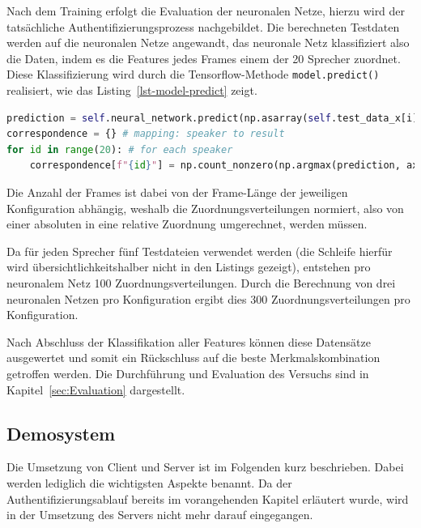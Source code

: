 Nach dem Training erfolgt die Evaluation der neuronalen Netze, hierzu wird der tatsächliche Authentifizierungsprozess nachgebildet.
Die berechneten Testdaten werden auf die neuronalen Netze angewandt, das neuronale Netz klassifiziert also die Daten, indem es die Features jedes Frames einem der 20 Sprecher zuordnet.
Diese Klassifizierung wird durch die Tensorflow-Methode \texttt{model.predict()} realisiert, wie das Listing~\ref{lst-model-predict} zeigt.

\begin{lstlisting}[language=Python,caption=Evaluation mit model.predict und Normalisierung des Ergebnisses,label=lst-model-predict]
prediction = self.neural_network.predict(np.asarray(self.test_data_x[i])) # generate prediction for the sample
correspondence = {} # mapping: speaker to result
for id in range(20): # for each speaker
    correspondence[f"{id}"] = np.count_nonzero(np.argmax(prediction, axis=1) == id) / len(prediction) # normalization
\end{lstlisting}

Die Anzahl der Frames ist dabei von der Frame-Länge der jeweiligen Konfiguration abhängig, weshalb die Zuordnungsverteilungen normiert, also von einer absoluten in eine relative Zuordnung umgerechnet, werden müssen.

Da für jeden Sprecher fünf Testdateien verwendet werden (die Schleife hierfür wird übersichtlichkeitshalber nicht in den Listings gezeigt), entstehen pro neuronalem Netz 100 Zuordnungsverteilungen.
Durch die Berechnung von drei neuronalen Netzen pro Konfiguration ergibt dies 300 Zuordnungsverteilungen pro Konfiguration.

Nach Abschluss der Klassifikation aller Features können diese Datensätze ausgewertet und somit ein Rückschluss auf die beste Merkmalskombination getroffen werden.
Die Durchführung und Evaluation des Versuchs sind in Kapitel~\ref{sec:Evaluation} dargestellt.

\subsection{Demosystem} \label{sec:umsetzung-demo}

\textauthor{\vHS}{}{}

Die Umsetzung von Client und Server ist im Folgenden kurz beschrieben.
Dabei werden lediglich die wichtigsten Aspekte benannt.
Da der Authentifizierungsablauf bereits im vorangehenden Kapitel erläutert wurde, wird in der Umsetzung des Servers nicht mehr darauf eingegangen.

